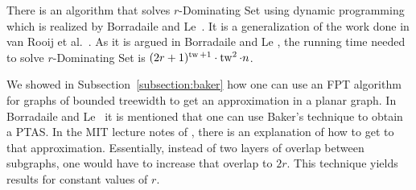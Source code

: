 There is an algorithm that solves $r$-Dominating Set using dynamic programming which is realized 
by Borradaile and Le~\cite[Theorem 1, Appendix B.]{borradaile2015optimal}. It is a generalization 
of the work done in van Rooij et al.~\cite{van2009dynamic}. As it is argued in Borradaile and Le
\cite[Appendix B.]{borradaile2015optimal}, the running time needed to solve $r$-Dominating Set 
is $(2r + 1)^{\operatorname{tw} + 1} \cdot \operatorname{tw}^{2} \cdot n$. 

We showed in Subsection~\ref{subsection:baker} how one can use an FPT algorithm 
for graphs of bounded treewidth to get an approximation in a planar graph. In 
Borradaile and Le~\cite{borradaile2015optimal} it is mentioned that one can use Baker's technique 
to obtain a PTAS. In the MIT lecture notes of \cite{demaine2011lecture9}, there is an explanation 
of how to get to that approximation. Essentially, instead of two layers of overlap between 
subgraphs, one would have to increase that overlap to $2r$. This technique yields results 
for constant values of $r$.